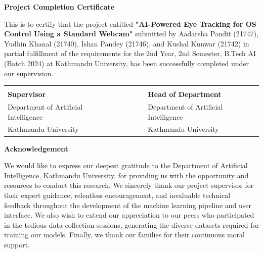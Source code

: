 \documentclass[12pt,a4paper]{report}
\begin{document}
\newpage
{}
\begin{center}
    \textbf{\large Project Completion Certificate}
\end{center}
\vspace{1cm}
This is to certify that the project entitled \textbf{"AI-Powered Eye Tracking for OS Control Using a Standard Webcam"} submitted by Aadarsha Pandit (21747), Yudhin Khanal (21740), Ishan Pandey (21746), and Kushal Kunwar (21742) in partial fulfillment of the requirements for the 2nd Year, 2nd Semester, B.Tech AI (Batch 2024) at Kathmandu University, has been successfully completed under our supervision.

\vspace{3cm}
\noindent\begin{tabular}{@{}p{0.45\linewidth}p{0.1\linewidth}p{0.45\linewidth}@{}}
\hrulefill && \hrulefill \\
\textbf{Supervisor} && \textbf{Head of Department} \\
Department of Artificial Intelligence && Department of Artificial Intelligence \\
Kathmandu University && Kathmandu University \\
\end{tabular}

\newpage
{}
\begin{center}
    \textbf{\large Acknowledgement}
\end{center}
\vspace{0.5cm}
We would like to express our deepest gratitude to the Department of Artificial Intelligence, Kathmandu University, for providing us with the opportunity and resources to conduct this research. We sincerely thank our project supervisor for their expert guidance, relentless encouragement, and invaluable technical feedback throughout the development of the machine learning pipeline and user interface. We also wish to extend our appreciation to our peers who participated in the tedious data collection sessions, generating the diverse datasets required for training our models. Finally, we thank our families for their continuous moral support.
\end{document}
